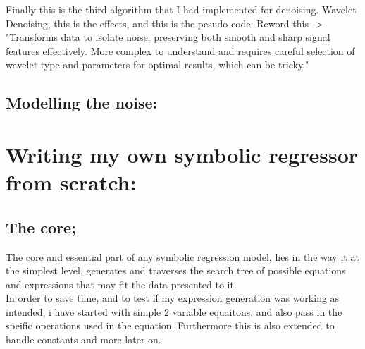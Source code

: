 \documentclass{article}
\begin{document}
Finally this is the third algorithm that I had implemented for denoising. Wavelet Denoising, this is the effects, and this is the pesudo code. Reword this -> "Transforms data to isolate noise, preserving both smooth and sharp signal features effectively. More complex to understand and requires careful selection of wavelet type and parameters for optimal results, which can be tricky."\\


\subsection{ Modelling the noise: }







\section{Writing my own symbolic regressor from scratch: }

\subsection{The core;}

The core and essential part of any symbolic regression model, lies in the way it at the simplest level, generates and traverses the search tree of possible equations and expressions that may fit the data presented to it. \\ 

In order to save time, and to test if my expression generation was working as intended, i have started with simple 2 variable equaitons, and also pass in the speific operations used in the equation. Furthermore this is also extended to handle constants and more later on.\\ 
\end{document}
